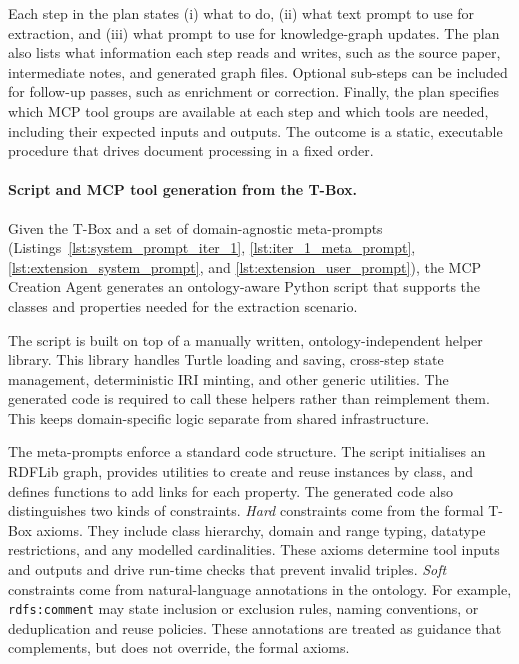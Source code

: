 Each step in the plan states (i) what to do, (ii) what text prompt to use for extraction, and (iii) what prompt to use for knowledge-graph updates. The plan also lists what information each step reads and writes, such as the source paper, intermediate notes, and generated graph files. Optional sub-steps can be included for follow-up passes, such as enrichment or correction. Finally, the plan specifies which MCP tool groups are available at each step and which tools are needed, including their expected inputs and outputs. The outcome is a static, executable procedure that drives document processing in a fixed order.


\paragraph{Script and MCP tool generation from the T-Box.}
Given the T-Box and a set of domain-agnostic meta-prompts (Listings~\ref{lst:system_prompt_iter_1}, \ref{lst:iter_1_meta_prompt}, \ref{lst:extension_system_prompt}, and \ref{lst:extension_user_prompt}), the MCP Creation Agent generates an ontology-aware Python script that supports the classes and properties needed for the extraction scenario.

The script is built on top of a manually written, ontology-independent helper library. This library handles Turtle loading and saving, cross-step state management, deterministic IRI minting, and other generic utilities. The generated code is required to call these helpers rather than reimplement them. This keeps domain-specific logic separate from shared infrastructure.

The meta-prompts enforce a standard code structure. The script initialises an RDFLib graph, provides utilities to create and reuse instances by class, and defines functions to add links for each property. The generated code also distinguishes two kinds of constraints. \emph{Hard} constraints come from the formal T-Box axioms. They include class hierarchy, domain and range typing, datatype restrictions, and any modelled cardinalities. These axioms determine tool inputs and outputs and drive run-time checks that prevent invalid triples. \emph{Soft} constraints come from natural-language annotations in the ontology. For example, \texttt{rdfs:comment} may state inclusion or exclusion rules, naming conventions, or deduplication and reuse policies. These annotations are treated as guidance that complements, but does not override, the formal axioms.

  

